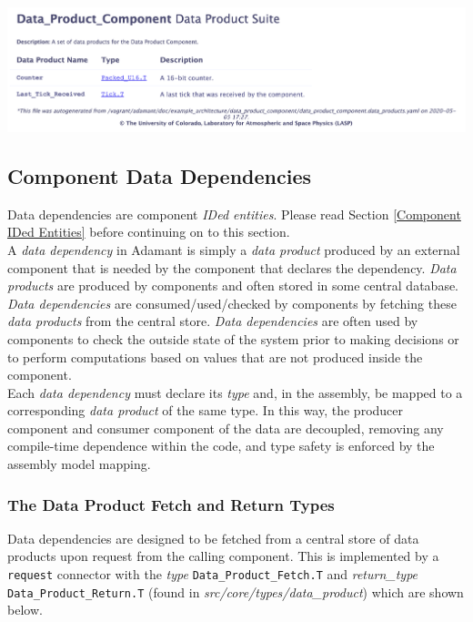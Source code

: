 \vspace{5mm} %
\includegraphics[width=\textwidth]{images/dataproductshtml.png}
\vspace{5mm} %

\subsection{Component Data Dependencies} \label{Component Data Dependencies}

Data dependencies are component \textit{IDed entities}. Please read Section \ref{Component IDed Entities} before continuing on to this section. \\

A \textit{data dependency} in Adamant is simply a \textit{data product} produced by an external component that is needed by the component that declares the dependency. \textit{Data products} are produced by components and often stored in some central database. \textit{Data dependencies} are consumed/used/checked by components by fetching these \textit{data products} from the central store. \textit{Data dependencies} are often used by components to check the outside state of the system prior to making decisions or to perform computations based on values that are not produced inside the component. \\

Each \textit{data dependency} must declare its \textit{type} and, in the assembly, be mapped to a corresponding \textit{data product} of the same type. In this way, the producer component and consumer component of the data are decoupled, removing any compile-time dependence within the code, and type safety is enforced by the assembly model mapping.

\subsubsection{The Data Product Fetch and Return Types}

Data dependencies are designed to be fetched from a central store of data products upon request from the calling component. This is implemented by a \texttt{request} connector with the \textit{type} \texttt{Data\_Product\_Fetch.T} and \textit{return\_type} \texttt{Data\_Product\_Return.T} (found in \textit{src/core/types/data\_product}) which are shown below. \\

